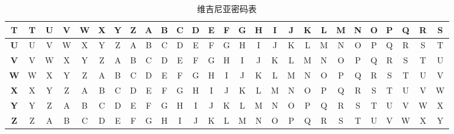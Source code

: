 \begin{table}[H]
{\begin{tabular}{c|c|c|c|c|c|c|c|c|c|c|c|c|c|c|c|c|c|c|c|c|c|c|c|c|c|c|}
            \hline
            \textbf{T} & T          & U          & V          & W          & X          & Y          & Z          & A          & B          & C          & D          & E          & F          & G          & H          & I          & J          & K          & L          & M          & N          & O          & P          & Q          & R          & S          \\[-1ex]
            \hline
            \textbf{U} & U          & V          & W          & X          & Y          & Z          & A          & B          & C          & D          & E          & F          & G          & H          & I          & J          & K          & L          & M          & N          & O          & P          & Q          & R          & S          & T          \\[-1ex]
            \hline
            \textbf{V} & V          & W          & X          & Y          & Z          & A          & B          & C          & D          & E          & F          & G          & H          & I          & J          & K          & L          & M          & N          & O          & P          & Q          & R          & S          & T          & U          \\[-1ex]
            \hline
            \textbf{W} & W          & X          & Y          & Z          & A          & B          & C          & D          & E          & F          & G          & H          & I          & J          & K          & L          & M          & N          & O          & P          & Q          & R          & S          & T          & U          & V          \\[-1ex]
            \hline
            \textbf{X} & X          & Y          & Z          & A          & B          & C          & D          & E          & F          & G          & H          & I          & J          & K          & L          & M          & N          & O          & P          & Q          & R          & S          & T          & U          & V          & W          \\[-1ex]
            \hline
            \textbf{Y} & Y          & Z          & A          & B          & C          & D          & E          & F          & G          & H          & I          & J          & K          & L          & M          & N          & O          & P          & Q          & R          & S          & T          & U          & V          & W          & X          \\[-1ex]
            \hline
            \textbf{Z} & Z          & A          & B          & C          & D          & E          & F          & G          & H          & I          & J          & K          & L          & M          & N          & O          & P          & Q          & R          & S          & T          & U          & V          & W          & X          & Y          \\[-1ex]
            \hline
        \end{tabular}
    }
    \caption{维吉尼亚密码表}
\end{table}

